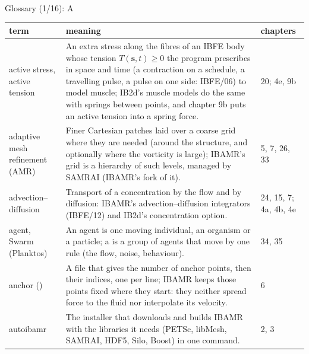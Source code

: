 \documentclass[aspectratio=169,11pt]{beamer}
\makeatletter
\newenvironment{glossarytable}{\scriptsize\renewcommand{\arraystretch}{1.08}%
  \begin{tabular}{@{}L{0.19\textwidth}L{0.63\textwidth}L{0.12\textwidth}@{}}\toprule
  term & meaning & chapters\\\midrule}{\bottomrule\end{tabular}}
\makeatother
\begin{document}
\begin{frame}{Glossary (1/16): A}
\label{fr:g1}
\begin{glossarytable}
active stress, active tension & An extra stress along the fibres of an IBFE body whose tension $T(\mathbf{s}, t) \ge 0$ the program prescribes in space and time (a contraction on a schedule, a travelling pulse, a pulse on one side: IBFE/06) to model muscle; IB2d's muscle models do the same with springs between points, and chapter 9b puts an active tension into a spring force. & 20; 4e, 9b\\
adaptive mesh refinement (AMR) & Finer Cartesian patches laid over a coarse grid where they are needed (around the structure, and optionally where the vorticity is large); IBAMR's grid is a hierarchy of such levels, managed by SAMRAI (IBAMR's fork of it). & 5, 7, 26, 33\\
advection--diffusion & Transport of a concentration by the flow and by diffusion: IBAMR's advection--diffusion integrators (IBFE/12) and IB2d's concentration option. & 24, 15, 7; 4a, 4b, 4e\\
agent, Swarm (Planktos) & An agent is one moving individual, an organism or a particle; a  is a group of agents that move by one rule (the flow, noise, behaviour). & 34, 35\\
anchor () & A file that gives the number of anchor points, then their indices, one per line; IBAMR keeps those points fixed where they start: they neither spread force to the fluid nor interpolate its velocity. & 6\\
autoibamr & The installer that downloads and builds IBAMR with the libraries it needs (PETSc, libMesh, SAMRAI, HDF5, Silo, Boost) in one command. & 2, 3\\
\end{glossarytable}
\end{frame}
\end{document}
